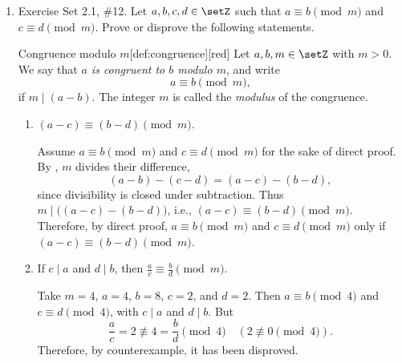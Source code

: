 \begin{enumerate}
\newpage 
\item Exercise Set 2.1, \#12. 
Let $a,b,c,d \in \setZ$ such that $a \equiv b \pmod{m}$ and $c \equiv d \pmod{m}$. Prove or disprove the following statements.
\begin{define}{Congruence modulo $m$}[def:congruence][red]
  Let $a,b,m\in\setZ$ with $m>0$. We say that \emph{$a$ is congruent to $b$ modulo $m$}, and write
  \[
  a\equiv b\pmod{m},
  \]
  if $m\mid (a-b)$. The integer $m$ is called the \emph{modulus} of the congruence.
\end{define}
\begin{enumerate}
  \item $(a-c) \equiv (b-d) \pmod{m}$.
  \begin{subprove}
    Assume $a \equiv b \pmod{m}$ and $c \equiv d \pmod{m}$ for the sake of direct proof. By , 
    $m$ divides their difference,
    \[
      (a-b)-(c-d)=(a-c)-(b-d),
    \]
    since divisibility is closed under subtraction. Thus $m\mid\bigl((a-c)-(b-d)\bigr)$, i.e.,
    $(a-c)\equiv(b-d)\pmod{m}$.\vspace*{10px}\\
    Therefore, by direct proof, $a \equiv b \pmod{m}$ and $c \equiv d \pmod{m}$ only if $(a-c) \equiv (b-d) \pmod{m}$.
  \end{subprove}
  \item If $c \mid a$ and $d \mid b$, then $\tfrac{a}{c} \equiv \tfrac{b}{d} \pmod{m}$.
  \begin{subdisprove}
    Take $m=4$, $a=4$, $b=8$, $c=2$, and $d=2$.
    Then $a\equiv b\pmod{4}$ and $c\equiv d\pmod{4}$, with $c\mid a$ and $d\mid b$. But
    \[
      \frac{a}{c}=2 \not\equiv 4=\frac{b}{d} \pmod{4} \quad(2\not\equiv 0\pmod{4}).
    \]
    Therefore, by counterexample, it has been disproved.
  \end{subdisprove}
\end{enumerate}







\end{enumerate}
